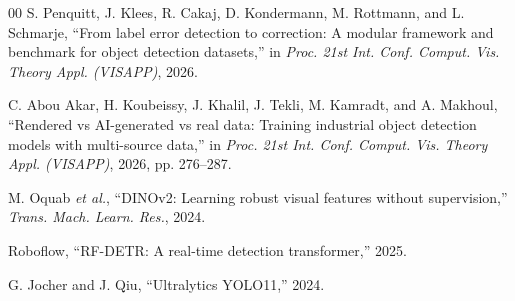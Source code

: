 \documentclass[conference]{IEEEtran}
\begin{document}
\begin{thebibliography}{00}
 S. Penquitt, J. Klees, R. Cakaj, D. Kondermann,
M. Rottmann, and L. Schmarje, ``From label error detection to correction: A modular
framework and benchmark for object detection datasets,'' in \emph{Proc. 21st Int.
Conf. Comput. Vis. Theory Appl. (VISAPP)}, 2026.

 C. Abou Akar, H. Koubeissy, J. Khalil, J. Tekli,
M. Kamradt, and A. Makhoul, ``Rendered vs AI-generated vs real data: Training
industrial object detection models with multi-source data,'' in \emph{Proc. 21st
Int. Conf. Comput. Vis. Theory Appl. (VISAPP)}, 2026, pp. 276--287.

 M. Oquab \emph{et al.}, ``DINOv2: Learning robust visual
features without supervision,'' \emph{Trans. Mach. Learn. Res.}, 2024.

 Roboflow, ``RF-DETR: A real-time detection transformer,'' 2025.

 G. Jocher and J. Qiu, ``Ultralytics YOLO11,'' 2024.

\end{thebibliography}
\end{document}
